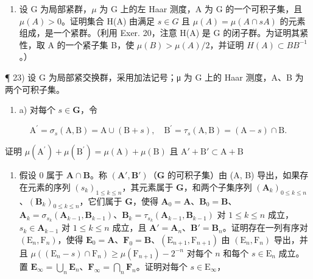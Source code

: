 \begin{enumerate}
\def\labelenumi{\arabic{enumi})}
\setcounter{enumi}{21}
\tightlist
\item
  设 G 为局部紧群，\(\mu\) 为 G 上的左 Haar 测度，A 为 G 的一个可积子集，且 \(\mu(A) > 0\)。证明集合 H(A) 由满足 \(s \in G\) 且 \(\mu(A) = \mu(A \cap sA)\) 的元素组成，是一个紧群。（利用 Exer. 20，注意 H(A) 是 G 的闭子群。为证明其紧性，取 A 的一个紧子集 B，使 \(\mu(B) > \mu(A)/2\)，并证明 \(H(A) \subset BB^{-1}\)。）
\end{enumerate}

¶ 23) 设 G 为局部紧交换群，采用加法记号；μ 为 G 上的 Haar 测度，A、B 为两个可积子集。

\begin{enumerate}
\def\labelenumi{\alph{enumi})}
\tightlist
\item
  a) 对每个 \(s \in \mathbf{G}\)，令
\end{enumerate}

\[
\mathrm{A} ^ {\prime} = \sigma_ {s} (\mathrm{A}, \mathrm{B}) = \mathrm{A} \cup (\mathrm{B} + s), \quad \mathrm{B} ^ {\prime} = \tau_ {s} (\mathrm{A}, \mathrm{B}) = (\mathrm{A} - s) \cap \mathrm{B}.
\]

证明 \(\mu (\mathrm{A}^{\prime}) + \mu (\mathrm{B}^{\prime}) = \mu (\mathrm{A}) + \mu (\mathrm{B})\) 且 \(\mathrm{A}' + \mathrm{B}'\subset \mathrm{A} + \mathrm{B}\)

\begin{enumerate}
\def\labelenumi{\alph{enumi})}
\setcounter{enumi}{1}
\tightlist
\item
  假设 0 属于 \(\mathbf{A} \cap \mathbf{B}\)。称 \((\mathbf{A}', \mathbf{B}')\)（\(\mathbf{G}\) 的可积子集）由 (A, B) 导出，如果存在元素的序列 \((s_k)_{1 \leqslant k \leqslant n}\)，其元素属于 \(\mathbf{G}\)，和两个子集序列 \((\mathbf{A}_k)_{0 \leqslant k \leqslant n}\)、\((\mathbf{B}_k)_{0 \leqslant k \leqslant n}\)，它们属于 \(\mathbf{G}\)，使得 \(\mathbf{A}_0 = \mathbf{A}\)、\(\mathbf{B}_0 = \mathbf{B}\)、\(\mathbf{A}_k = \sigma_{s_k}(\mathbf{A}_{k-1}, \mathbf{B}_{k-1})\)、\(\mathbf{B}_k = \tau_{s_k}(\mathbf{A}_{k-1}, \mathbf{B}_{k-1})\) 对 \(1 \leqslant k \leqslant n\) 成立，\(s_k \in \mathbf{A}_{k-1}\) 对 \(1 \leqslant k \leqslant n\) 成立，且 \(\mathbf{A}' = \mathbf{A}_n\)、\(\mathbf{B}' = \mathbf{B}_n\)。证明存在一列有序对 \((\mathrm{E}_n, \mathrm{F}_n)\)，使得 \(\mathbf{E}_0 = \mathbf{A}\)、\(\mathbf{F}_0 = \mathbf{B}\)、\((\mathrm{E}_{n+1}, \mathrm{F}_{n+1})\) 由 \((\mathrm{E}_n, \mathrm{F}_n)\) 导出，并且 \(\mu((\mathrm{E}_n - s) \cap \mathrm{F}_n) \geqslant \mu(\mathrm{F}_{n+1}) - 2^{-n}\) 对每个 \(n\) 和每个 \(s \in \mathrm{E}_n\) 成立。置 \(\mathbf{E}_{\infty} = \bigcup_{n} \mathbf{E}_n\)、\(\mathbf{F}_{\infty} = \bigcap_{n} \mathbf{F}_n\)。证明对每个 \(s \in \mathrm{E}_{\infty}\)，
\end{enumerate}

